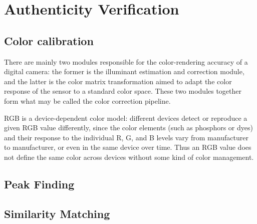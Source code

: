 \documentclass[thesis.tex]{subfiles}
\begin{document}
\section{Authenticity Verification}

\subsection{Color calibration}
There are mainly two modules responsible for the color-rendering accuracy of a digital camera: the former is the illuminant estimation and correction module, and the latter is the color matrix transformation aimed to adapt the color response of the sensor to a standard color space. These two modules together form what may be called the color correction pipeline.

RGB is a device-dependent color model: different devices detect or reproduce a given RGB value differently, since the color elements (such as phosphors or dyes) and their response to the individual R, G, and B levels vary from manufacturer to manufacturer, or even in the same device over time. Thus an RGB value does not define the same color across devices without some kind of color management.


\subsection{Peak Finding}

\subsection{Similarity Matching}
\end{document}
